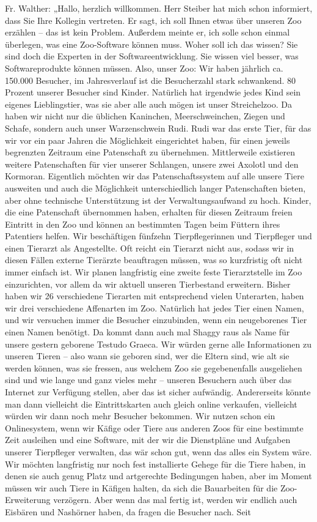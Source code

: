 Fr. Walther: „Hallo, herzlich willkommen. Herr Steiber hat mich schon informiert, dass Sie Ihre Kollegin vertreten. Er sagt, ich soll Ihnen etwas über unseren Zoo erzählen – das ist kein Problem. Außerdem meinte er, ich solle schon einmal überlegen, was eine Zoo-Software können muss. Woher soll ich das wissen? Sie sind doch die Experten in der Softwareentwicklung. Sie wissen viel besser, was Softwareprodukte können müssen. Also, unser Zoo: Wir haben jährlich ca. 150.000 Besucher, im Jahresverlauf ist die Besucherzahl stark schwankend. 80 Prozent unserer Besucher sind Kinder. Natürlich hat irgendwie jedes Kind sein eigenes Lieblingstier, was sie aber alle auch mögen ist unser Streichelzoo. Da haben wir nicht nur die üblichen Kaninchen, Meerschweinchen, Ziegen und Schafe, sondern auch unser Warzenschwein Rudi. Rudi war das erste Tier, für das wir vor ein paar Jahren die Möglichkeit eingerichtet haben, für einen jeweils begrenzten Zeitraum eine Patenschaft zu übernehmen. Mittlerweile existieren weitere Patenschaften für vier unserer Schlangen, unsere zwei Axolotl und den Kormoran. Eigentlich möchten wir das Patenschaftssystem auf alle unsere Tiere ausweiten und auch die Möglichkeit unterschiedlich langer Patenschaften bieten, aber ohne technische Unterstützung ist der Verwaltungsaufwand zu hoch. Kinder, die eine Patenschaft übernommen haben, erhalten für diesen Zeitraum freien Eintritt in den Zoo und können an bestimmten Tagen beim Füttern ihres Patentiers helfen. Wir beschäftigen fünfzehn Tierpflegerinnen und Tierpfleger und einen Tierarzt als Angestellte. Oft reicht ein Tierarzt nicht aus, sodass wir in diesen Fällen externe Tierärzte beauftragen müssen, was so kurzfristig oft nicht immer einfach ist. Wir planen langfristig eine zweite feste Tierarztstelle im Zoo einzurichten, vor allem da wir aktuell unseren Tierbestand erweitern. Bisher haben wir 26 verschiedene Tierarten mit entsprechend vielen Unterarten, \zb haben wir drei verschiedene Affenarten im Zoo. Natürlich hat jedes Tier einen Namen, und wir versuchen immer die Besucher einzubinden, wenn ein neugeborenes Tier einen Namen benötigt. Da kommt dann auch mal Shaggy raus als Name für unsere gestern geborene Testudo Graeca. Wir würden gerne alle Informationen zu unseren Tieren – also wann sie geboren sind, wer die Eltern sind, wie alt sie werden können, was sie fressen, aus welchem Zoo sie gegebenenfalls ausgeliehen sind und wie lange und ganz vieles mehr – unseren Besuchern auch über das Internet zur Verfügung stellen, aber das ist sicher aufwändig. Andererseits könnte man dann vielleicht die Eintrittskarten auch gleich online verkaufen, vielleicht würden wir dann noch mehr Besucher bekommen. Wir nutzen schon ein Onlinesystem, wenn wir Käfige oder Tiere aus anderen Zoos für eine bestimmte Zeit ausleihen und eine Software, mit der wir die Dienstpläne und Aufgaben unserer Tierpfleger verwalten, das wär schon gut, wenn das alles ein System wäre. Wir möchten langfristig nur noch fest installierte Gehege für die Tiere haben, in denen sie auch genug Platz und artgerechte Bedingungen haben, aber im Moment müssen wir auch Tiere in Käfigen halten, da sich die Bauarbeiten für die Zoo-Erweiterung verzögern. Aber wenn das mal fertig ist, werden wir endlich auch Eisbären und Nashörner haben, da fragen die Besucher nach. Seit 